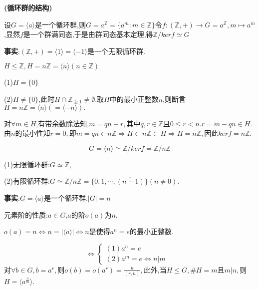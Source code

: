 \documentclass[UTF8]{article}
\begin{document}
\textbf{(循环群的结构)}

设$G=\langle a\rangle$是一个循环群,则$G=a^\mathbb{Z}=\{a^m:m\in\mathbb{Z}\}$令$f:(\mathbb{Z},+)\to G=a^\mathbb{Z},m\mapsto a^m$,显然$f$是一个群满同态,于是由群同态基本定理,得$\mathbb{Z}/kerf\simeq G$

\textbf{事实}:$(\mathbb{Z},+)=\langle 1\rangle=\langle {-1}\rangle$是一个无限循环群.

$H\le\mathbb{Z},H=n\mathbb{Z}=\langle n\rangle(n\in\mathbb{Z})$

(1)$H=\{0\}$

(2)$H\ne\{0\}$,此时$H\cap\mathbb{Z}_{{\ge}{1}}\ne\emptyset.$取$H$中的最小正整数$n$,则断言$H=n\mathbb{Z}=\langle n\rangle(=\langle -n\rangle).$

对$\forall m\in H$,有带余数除法知,$m=qn+r,$其中$q,r\in\mathbb{Z}$且$0\le r<n.r=m-qn\in H.$由$n$的最小性知$r=0,$即$m=qn\in n\mathbb{Z}\Rightarrow H\subset n\mathbb{Z}\subset H\Rightarrow H=n\mathbb{Z},$因此$kerf=n\mathbb{Z}.$

$$G=\langle n\rangle\simeq\mathbb{Z}/kerf=\mathbb{Z}/n\mathbb{Z}$$

(1)无限循环群:$G\simeq\mathbb{Z}$,

(2)有限循环群:$G\simeq\mathbb{Z}/n\mathbb{Z}=\{\overline{0},\overline{1},\cdots,\overline{(n-1)}\}(n\ne 0)$.

\textbf{事实}:$G=\langle a\rangle$是一个循环群.$|G|=n$

元素阶的性质:$a\in G$,$a$的阶$o(a)$为$n$.
\begin{center}
	$o(a)=n\Leftrightarrow n=|\langle a\rangle|\Leftrightarrow n$是使得$a^n=e$的最小正整数.
\end{center}
\begin{displaymath}
\Leftrightarrow  \left\{ \begin{array}{ll}
(1)a^n=e &\\
(2) a^m=e\Leftrightarrow n|m
\end{array} \right.
\end{displaymath}
对$\forall b\in G,b=a^r,$则$o(b)=o(a^r)=\frac{n}{(r,n)},$此外,当$H\le G,\# H=m$且$m|n,$则$H=\langle a^{\frac{n}{m}}\rangle$.
\end{document}
